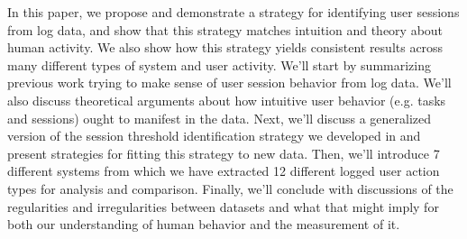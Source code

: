 In this paper, we propose and demonstrate a strategy for identifying user sessions from log data, and show that this strategy matches intuition and theory about human activity.  We also show how this strategy yields consistent results across many different types of system and user activity.  We'll start by summarizing previous work trying to make sense of user session behavior from log data.  We'll also discuss theoretical arguments about how intuitive user behavior (e.g. tasks and sessions) ought to manifest in the data.  Next, we'll discuss a generalized version of the session threshold identification strategy we developed in \cite{geiger2013using} and present strategies for fitting this strategy to new data.  Then, we'll introduce 7 different systems from which we have extracted 12 different logged user action types for analysis and comparison. Finally, we'll conclude with discussions of the regularities and irregularities between datasets and what that might imply for both our understanding of human behavior and the measurement of it.
